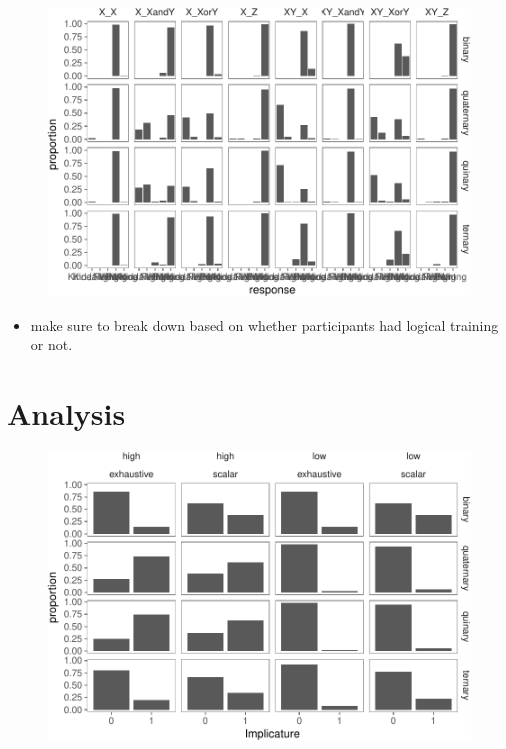 \documentclass[floatsintext,man]{apa6}
\providecommand{\tightlist}{%
  \setlength{\itemsep}{0pt}\setlength{\parskip}{0pt}}
\theoremstyle{definition}
\theoremstyle{definition}
\theoremstyle{definition}
\theoremstyle{remark}
\begin{document}
\begin{figure}
\centering
\includegraphics{writeup_files/figure-latex/unnamed-chunk-2-1.pdf}
\caption{}
\end{figure}

\begin{itemize}
\tightlist
\item
  make sure to break down based on whether participants had logical
  training or not.
\end{itemize}

\section{Analysis}\label{analysis}

\begin{figure}
\centering
\includegraphics{writeup_files/figure-latex/unnamed-chunk-3-1.pdf}
\caption{}
\end{figure}
\end{document}
